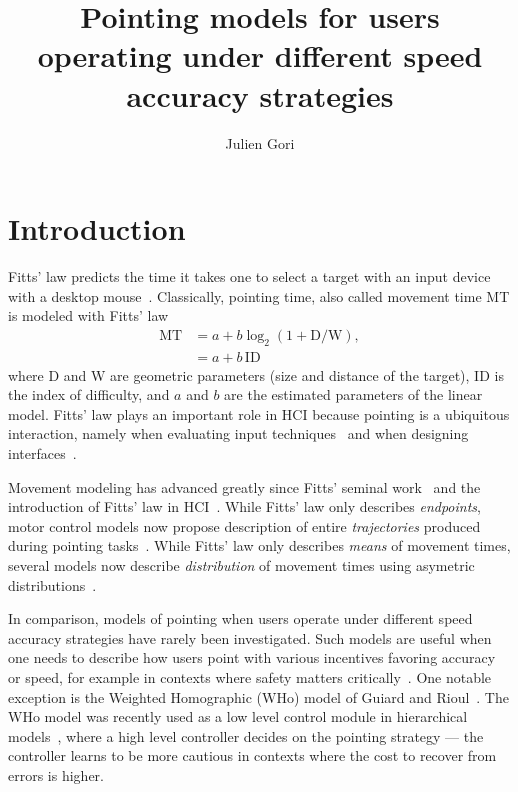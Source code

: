 \documentclass[12pt,a4paper]{article}
\title{Pointing models for users operating under different speed accuracy strategies}
\author{Julien Gori}
\begin{document}
\maketitle


\section{Introduction\label{sec:introduction}}
Fitts' law predicts the time it takes one to select a target with an input device \eg with a desktop mouse~\cite{card1978}. Classically, pointing time, also called movement time MT is modeled with Fitts' law~\cite{fitts1954, soukoreff2004, gori2018tochi}
\begin{align}
	\text{MT} & = a + b \log_2 (1 + \text{D}/\text{W}), \label{eq:fitts} \\
	          & = a + b\,\text{ID}
\end{align}
where D and W are geometric parameters (size and distance of the target), ID is the index of difficulty, and $a$ and $b$ are the estimated parameters of the linear model. Fitts' law plays an important role in HCI because pointing is a ubiquitous interaction, namely when evaluating input techniques~\cite{soukoreff2004} and when designing interfaces~\cite{cockburn2007}.


Movement modeling has advanced greatly since Fitts' seminal work~\cite{fitts1954} and the introduction of Fitts' law in HCI~\cite{card1978}. While Fitts' law only describes \emph{endpoints}, motor control models now propose description of entire \emph{trajectories} produced during pointing tasks~\cite{gori2020, gori2023, todorov2002,saveriano2023, fisher2021}.
While Fitts' law only describes \emph{means} of movement times, several models now describe \emph{distribution} of movement times using asymetric distributions~\cite{chapuis2007, jude2016, gori2019,li2024,zhao2022, nieuwenhuizen2016}.


In comparison, models of pointing when users operate under different speed accuracy strategies have rarely been investigated.
Such models are useful when one needs to describe how users point with various incentives \ie favoring accuracy or speed, for example in contexts where safety matters critically~\cite{guiard2011b}.
One notable exception is the Weighted Homographic (WHo) model of Guiard and Rioul~\cite{guiard2015}. The WHo model was recently used as a low level control module in hierarchical models~\cite{jokinen2021, langerak2022}, where a high level controller decides on the pointing strategy --- the controller learns to be more cautious in contexts where the cost to recover from errors is higher.
\end{document}
